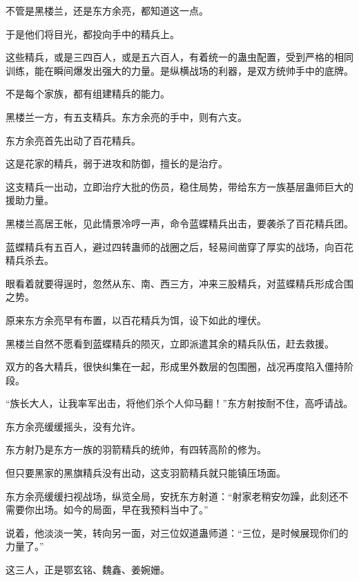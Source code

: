 \begin{this_body}
不管是黑楼兰，还是东方余亮，都知道这一点。

于是他们将目光，都投向手中的精兵上。

这些精兵，或是三四百人，或是五六百人，有着统一的蛊虫配置，受到严格的相同训练，能在瞬间爆发出强大的力量。是纵横战场的利器，是双方统帅手中的底牌。

不是每个家族，都有组建精兵的能力。

黑楼兰一方，有五支精兵。东方余亮的手中，则有六支。

东方余亮首先出动了百花精兵。

这是花家的精兵，弱于进攻和防御，擅长的是治疗。

这支精兵一出动，立即治疗大批的伤员，稳住局势，带给东方一族基层蛊师巨大的援助力量。

黑楼兰高居王帐，见此情景冷哼一声，命令蓝蝶精兵出击，要袭杀了百花精兵团。

蓝蝶精兵有五百人，避过四转蛊师的战圈之后，轻易间凿穿了厚实的战场，向百花精兵杀去。

眼看着就要得逞时，忽然从东、南、西三方，冲来三股精兵，对蓝蝶精兵形成合围之势。

原来东方余亮早有布置，以百花精兵为饵，设下如此的埋伏。

黑楼兰自然不愿看到蓝蝶精兵的陨灭，立即派遣其余的精兵队伍，赶去救援。

双方的各大精兵，很快纠集在一起，形成里外数层的包围圈，战况再度陷入僵持阶段。

“族长大人，让我率军出击，将他们杀个人仰马翻！”东方射按耐不住，高呼请战。

东方余亮缓缓摇头，没有允许。

东方射乃是东方一族的羽箭精兵的统帅，有四转高阶的修为。

但只要黑家的黑旗精兵没有出动，这支羽箭精兵就只能镇压场面。

东方余亮缓缓扫视战场，纵览全局，安抚东方射道：“射家老稍安勿躁，此刻还不需要你出场。如今的局面，早在我预料当中了。”

说着，他淡淡一笑，转向另一面，对三位奴道蛊师道：“三位，是时候展现你们的力量了。”

这三人，正是鄂玄铭、魏鑫、姜婉姗。

\end{this_body}

